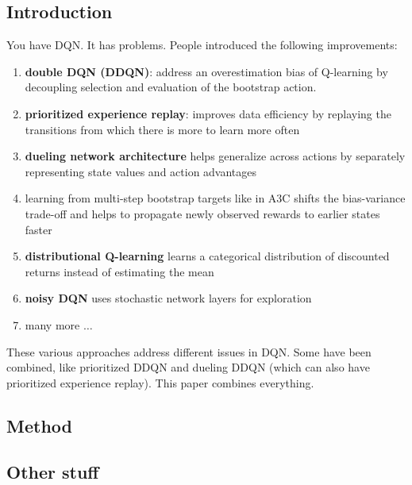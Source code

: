 \documentclass{article}
\begin{document}
\subsection{Introduction}
You have DQN. It has problems.
People introduced the following improvements:
\begin{enumerate}
		\item \textbf{double DQN (DDQN)}: address an overestimation bias of Q-learning by decoupling
				selection and evaluation of the bootstrap action.
		\item \textbf{prioritized experience replay}: improves data efficiency by replaying the transitions
				from which there is more to learn more often
		\item \textbf{dueling network architecture} helps generalize across actions by separately
				representing state values and action advantages
		\item learning from multi-step bootstrap targets like in A3C shifts the bias-variance
				trade-off and helps to propagate newly observed rewards to earlier states faster
		\item \textbf{distributional Q-learning} learns a categorical distribution of discounted returns
				instead of estimating the mean
		\item \textbf{noisy DQN} uses stochastic network layers for exploration
		\item many more $ \dots  $
\end{enumerate}
These various approaches address different issues in DQN.
Some have been combined, like prioritized DDQN and dueling DDQN (which
can also have prioritized experience replay).
This paper combines everything.


\subsection{Method}

\subsection{Other stuff}
\end{document}
